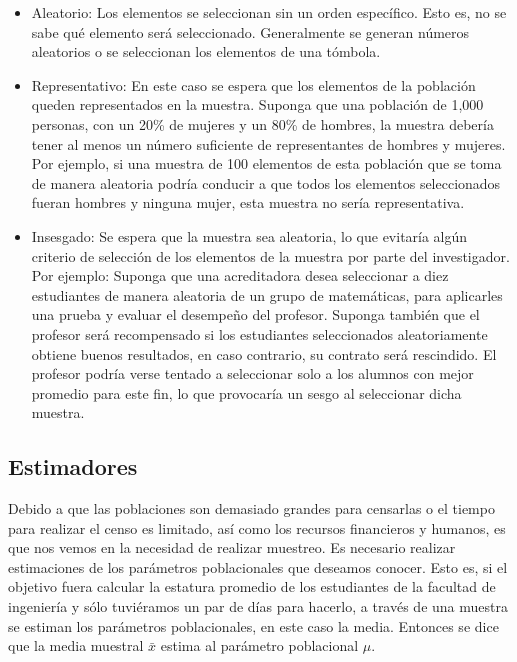 \documentclass[
  oneside]{book}
\providecommand{\tightlist}{%
  \setlength{\itemsep}{0pt}\setlength{\parskip}{0pt}}
\begin{document}
\begin{itemize}
\tightlist
\item
  Aleatorio: Los elementos se seleccionan sin un orden específico. Esto es, no se sabe qué elemento será seleccionado. Generalmente se generan números aleatorios o se seleccionan los elementos de una tómbola.
\item
  Representativo: En este caso se espera que los elementos de la población queden representados en la muestra. Suponga que una población de 1,000 personas, con un 20\% de mujeres y un 80\% de hombres, la muestra debería tener al menos un número suficiente de representantes de hombres y mujeres. Por ejemplo, si una muestra de 100 elementos de esta población que se toma de manera aleatoria podría conducir a que todos los elementos seleccionados fueran hombres y ninguna mujer, esta muestra no sería representativa.
\item
  Insesgado: Se espera que la muestra sea aleatoria, lo que evitaría algún criterio de selección de los elementos de la muestra por parte del investigador. Por ejemplo: Suponga que una acreditadora desea seleccionar a diez estudiantes de manera aleatoria de un grupo de matemáticas, para aplicarles una prueba y evaluar el desempeño del profesor. Suponga también que el profesor será recompensado si los estudiantes seleccionados aleatoriamente obtiene buenos resultados, en caso contrario, su contrato será rescindido. El profesor podría verse tentado a seleccionar solo a los alumnos con mejor promedio para este fin, lo que provocaría un sesgo al seleccionar dicha muestra.
\end{itemize}

\subsection{Estimadores}\label{estimadores}

Debido a que las poblaciones son demasiado grandes para censarlas o el tiempo para realizar el censo es limitado, así como los recursos financieros y humanos, es que nos vemos en la necesidad de realizar muestreo. Es necesario realizar estimaciones de los parámetros poblacionales que deseamos conocer. Esto es, si el objetivo fuera calcular la estatura promedio de los estudiantes de la facultad de ingeniería y sólo tuviéramos un par de días para hacerlo, a través de una muestra se estiman los parámetros poblacionales, en este caso la media. Entonces se dice que la media muestral \(\bar{x}\) estima al parámetro poblacional \(\mu\).
\end{document}
